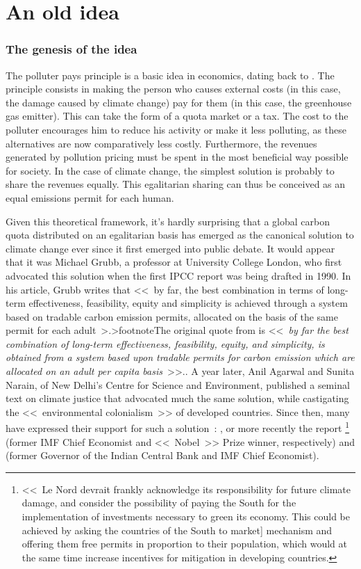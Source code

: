 \documentclass[a5paper,french,openany]{memoir}
\begin{document}
\section{An old idea} 

\subsubsection{The genesis of the idea}
The polluter pays principle is a basic idea in economics, dating back to \citet{pigou_economics_1920}. The principle consists in making the person who causes external costs (in this case, the damage caused by climate change) pay for them (in this case, the greenhouse gas emitter). This can take the form of a quota market or a tax. The cost to the polluter encourages him to reduce his activity or make it less polluting, as these alternatives are now comparatively less costly. %
Furthermore, the revenues generated by pollution pricing must be spent in the most beneficial way possible for society.  
In the case of climate change, the simplest solution is probably to share the revenues equally. This egalitarian sharing can thus be conceived as an equal emissions permit for each human. 

Given this theoretical framework, it's hardly surprising that a global carbon quota distributed on an egalitarian basis has emerged as the canonical solution to climate change ever since it first emerged into public debate. It would appear that it was Michael Grubb, a professor at University College London, who first advocated this solution when the first IPCC report was being drafted in 1990. In his article, Grubb writes that <<~by far, the best combination in terms of long-term effectiveness, feasibility, equity and simplicity is achieved through a system based on tradable carbon emission permits, allocated on the basis of the same permit for each adult~>.>footnote{The original quote from \citet{grubb_greenhouse_1990} is <<~\textit{by far the best combination of long-term effectiveness, feasibility, equity, and simplicity, is obtained from a system based upon tradable permits for carbon emission which are allocated on an adult per capita basis}~>>.}. A year later, Anil Agarwal and Sunita Narain, of New Delhi's Centre for Science and Environment, published a seminal text on climate justice that advocated much the same solution, while castigating the <<~environmental colonialism~>> of developed countries. %
Since then, many have expressed their support for such a solution~: \citet{bertram_tradeable_1992,baer_equity_2000,jamieson_climate_2001}, or more recently the report \citet{blanchard_major_2021}\footnote{<<~Le Nord devrait
frankly acknowledge its responsibility for future climate damage, and
consider the possibility of paying the South for the implementation of investments
necessary to green its economy. This could be achieved by asking the countries of the South to
market] mechanism and offering them free permits in proportion to their population, which would at the same time increase incentives for mitigation in developing countries.
} (former IMF Chief Economist and <<~Nobel~>> Prize winner, respectively) and \citet{rajan_global_2021} (former Governor of the Indian Central Bank and IMF Chief Economist). 
\end{document}
